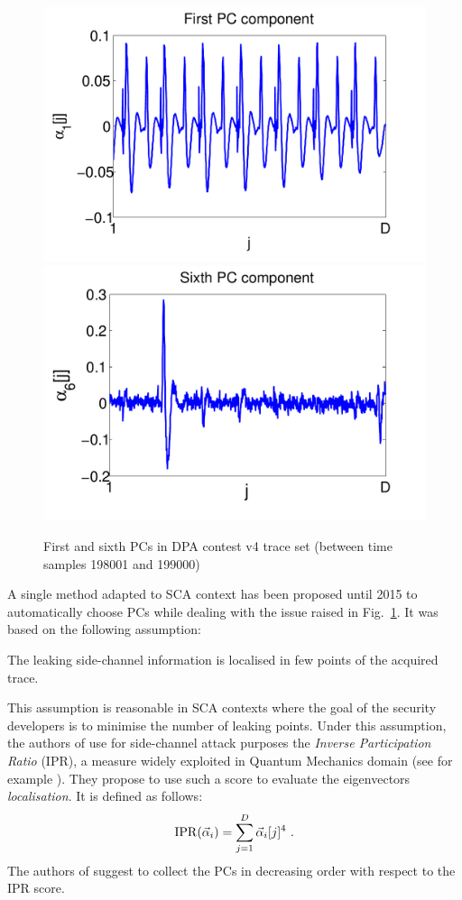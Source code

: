 \begin{figure}
\includegraphics[width=.45\textwidth]{../Figures/CARDIS2015/DPAcontestPC1_new.pdf} 
\includegraphics[width=.45\textwidth]{../Figures/CARDIS2015/DPAcontestPC6_new.pdf} 
\caption[First and sixth PCs in DPA contest v4 trace set.]{First and sixth PCs in DPA contest v4 trace set (between time samples 198001 and 199000)}\label{fig:DPAcontest}
\end{figure}

A single method adapted to SCA context has been proposed until 2015 to automatically choose PCs \cite{SCAclassProbl} while dealing with the issue raised in Fig.~\ref{fig:DPAcontest}. It was based on the following assumption:
\begin{assumption}\label{assum:local}
The leaking side-channel information is localised in few points of the acquired trace.
\end{assumption}
This assumption is reasonable in SCA contexts where the goal of the security developers is to minimise the number of leaking points.
Under this assumption, the authors of \cite{SCAclassProbl} use for side-channel attack purposes the {\em Inverse Participation Ratio} (IPR), a measure widely exploited in Quantum Mechanics domain (see for example \cite{guhr1998random}). They propose to use such a score to evaluate the eigenvectors {\em localisation}. It is defined as follows:
\begin{equation}
\mathrm{IPR}(\vec{\alpha}_i) = \sum_{j=1}^D \vec{\alpha}_i[j]^4 \mbox{ .}
\end{equation}
The authors of \cite{SCAclassProbl} suggest to collect the PCs in decreasing order with respect to the IPR score.\\

